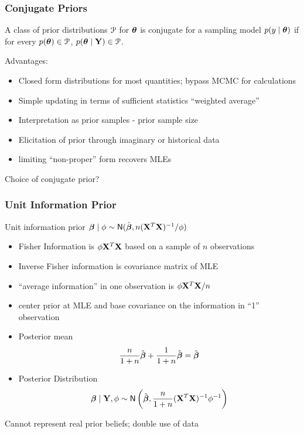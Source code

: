 \documentclass[]{beamer}
\begin{document}
\begin{frame}
  \frametitle{Conjugate Priors}
  \begin{definition}
    A class of prior distributions ${\cal{P}}$ for $\boldsymbol{\theta}$ is conjugate for a
    sampling model $p(y \mid \boldsymbol{\theta})$ if for every $p(\boldsymbol{\theta}) \in {\cal{P}}$, $p(\boldsymbol{\theta}
    \mid \mathbf{Y}) \in {\cal{P}}$.
  \end{definition}
\pause
  Advantages: \pause
  \begin{itemize}
  \item Closed form distributions for most quantities; bypass MCMC for
    calculations \pause
  \item Simple updating in terms of sufficient statistics ``weighted
    average'' \pause
  \item Interpretation as prior samples - prior sample size \pause
  \item Elicitation of prior through imaginary or historical data \pause
  \item limiting ``non-proper'' form recovers MLEs \pause
  \end{itemize}
Choice of conjugate prior?
\end{frame}

\begin{frame}
  \frametitle{Unit Information Prior}

Unit information prior $\boldsymbol{\beta} \mid \phi \sim \textsf{N}(\hat{\boldsymbol{\beta}}, n
   (\mathbf{X}^T\mathbf{X})^{-1}/\phi)$ \pause
  \begin{itemize}
\item Fisher Information is $\phi \mathbf{X}^T\mathbf{X}$ based on a sample of $n$
  observations \pause
\item Inverse Fisher information is covariance matrix of MLE \pause
\item ``average information'' in one observation is  $\phi \mathbf{X}^T\mathbf{X} /n$ \pause
\item center prior at MLE and base covariance on the information in
  ``1'' observation \pause
\item  Posterior mean
$$\frac{n}{1 + n} \hat{\boldsymbol{\beta}} +  \frac{1}{1 + n}\hat{\boldsymbol{\beta}} = \hat{\boldsymbol{\beta}}$$ \pause
\item Posterior Distribution
$$\boldsymbol{\beta} \mid \mathbf{Y}, \phi \sim \textsf{N}\left( \hat{\boldsymbol{\beta}}, \frac{n}{1 + n} (\mathbf{X}^T\mathbf{X})^{-1}
  \phi^{-1} \right)$$ \pause
    \end{itemize}
Cannot represent real prior beliefs; double use of data
\end{frame}
\end{document}
